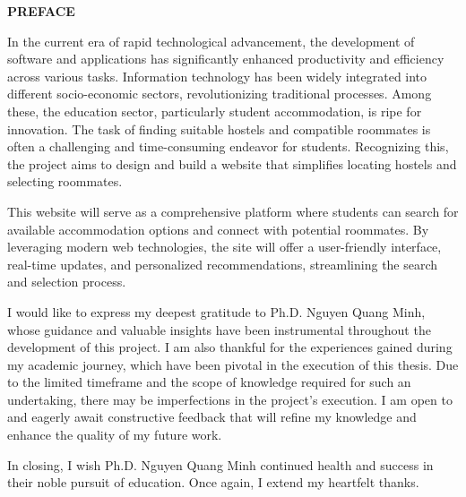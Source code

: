 \documentclass[../Main.tex]{subfiles}
\begin{document}
\begin{center}
    \Large{\textbf{PREFACE}}\\
\end{center}
\vspace{1cm}
In the current era of rapid technological advancement, the development of software and applications has significantly enhanced productivity and efficiency across various tasks.
Information technology has been widely integrated into different socio-economic sectors, revolutionizing traditional processes.
Among these, the education sector, particularly student accommodation, is ripe for innovation.
The task of finding suitable hostels and compatible roommates is often a challenging and time-consuming endeavor for students.
Recognizing this, the project aims to design and build a website that simplifies locating hostels and selecting roommates.

This website will serve as a comprehensive platform where students can search for available accommodation options and connect with potential roommates.
By leveraging modern web technologies, the site will offer a user-friendly interface, real-time updates, and personalized recommendations, streamlining the search and selection process.

I would like to express my deepest gratitude to Ph.D. Nguyen Quang Minh, whose guidance and valuable insights have been instrumental throughout the development of this project.
I am also thankful for the experiences gained during my academic journey, which have been pivotal in the execution of this thesis.
Due to the limited timeframe and the scope of knowledge required for such an undertaking, there may be imperfections in the project’s execution.
I am open to and eagerly await constructive feedback that will refine my knowledge and enhance the quality of my future work.

In closing, I wish Ph.D. Nguyen Quang Minh continued health and success in their noble pursuit of education.
Once again, I extend my heartfelt thanks.
\end{document}
